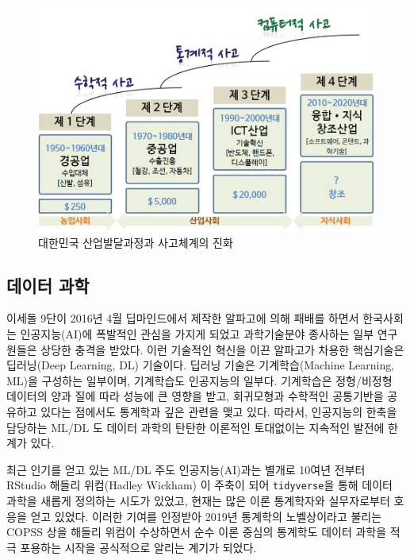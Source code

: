\documentclass[smallextended]{svjour3}       %
\begin{document}
\begin{figure}
\centering
\includegraphics{fig/korea-development-stages.png}
\caption[대한민국 산업발달과정과 사고체계의 진화]{대한민국
산업발달과정\footnotemark{}과 사고체계의 진화}
\end{figure}

\hypertarget{uxb370uxc774uxd130-uxacfcuxd559}{%
\subsection{데이터 과학}\label{uxb370uxc774uxd130-uxacfcuxd559}}

이세돌 9단이 2016년 4월 딥마인드에서 제작한 알파고에 의해 패배를 하면서
한국사회는 인공지능(AI)에 폭발적인 관심을 가지게 되었고 과학기술분야
종사하는 일부 연구원들은 상당한 충격을 받았다. 이런 기술적인 혁신을 이끈
알파고가 차용한 핵심기술은 딥러닝(Deep Learning, DL) 기술이다. 딥러닝
기술은 기계학습(Machine Learning, ML)을 구성하는 일부이며, 기계학습도
인공지능의 일부다. 기계학습은 정형/비정형 데이터의 양과 질에 따라 성능에
큰 영향을 받고, 회귀모형과 수학적인 공통기반을 공유하고 있다는 점에서도
통계학과 깊은 관련을 맺고 있다. 따라서, 인공지능의 한축을 담당하는 ML/DL
도 데이터 과학의 탄탄한 이론적인 토대없이는 지속적인 발전에 한계가 있다.

최근 인기를 얻고 있는 ML/DL 주도 인공지능(AI)과는 별개로 10여년 전부터
RStudio 해들리 위컴(Hadley Wickham) 이 주축이 되어 \texttt{tidyverse}을
통해 데이터 과학을 새롭게 정의하는 시도가 있었고, 현재는 많은 이론
통계학자와 실무자로부터 호응을 얻고 있었다. 이러한 기여를 인정받아
2019년 통계학의 노벨상이라고 불리는 COPSS 상을 해들리 위컴이 수상하면서
순수 이론 중심의 통계학도 데이터 과학을 적극 포용하는 시작을 공식적으로
알리는 계기가 되었다.
\end{document}
